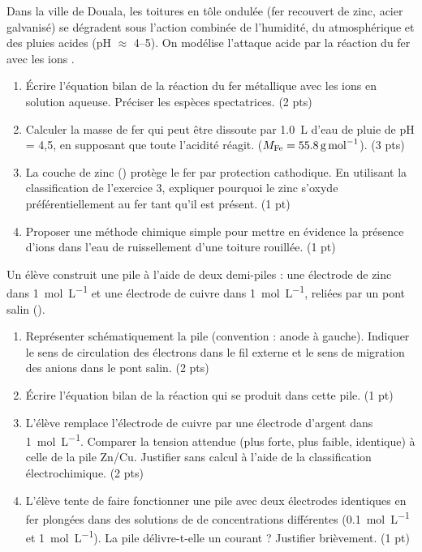 \documentclass[11pt]{article}
\begin{document}
\begin{exercice}
Dans la ville de Douala, les toitures en tôle ondulée (fer recouvert de zinc, acier galvanisé) se dégradent sous l'action combinée de l'humidité, du  atmosphérique et des pluies acides (pH $\approx$ 4--5). On modélise l'attaque acide par la réaction du fer avec les ions .
\begin{enumerate}
    \item Écrire l'équation bilan de la réaction du fer métallique avec les ions  en solution aqueuse. Préciser les espèces spectatrices. (2 pts)
    \item Calculer la masse de fer qui peut être dissoute par \SI{1,0}{L} d'eau de pluie de pH = 4,5, en supposant que toute l'acidité réagit. ($M_{\ce{Fe}} = \SI{55,8}{g.mol^{-1}}$). (3 pts)
    \item La couche de zinc () protège le fer par protection cathodique. En utilisant la classification de l'exercice 3, expliquer pourquoi le zinc s'oxyde préférentiellement au fer tant qu'il est présent. (1 pt)
    \item Proposer une méthode chimique simple pour mettre en évidence la présence d'ions  dans l'eau de ruissellement d'une toiture rouillée. (1 pt)
\end{enumerate}
\end{exercice}

\begin{exercice}
Un élève construit une pile à l'aide de deux demi-piles : une électrode de zinc dans  \SI{1}{mol.L^{-1}} et une électrode de cuivre dans  \SI{1}{mol.L^{-1}}, reliées par un pont salin ().
\begin{enumerate}
    \item Représenter schématiquement la pile (convention : anode à gauche). Indiquer le sens de circulation des électrons dans le fil externe et le sens de migration des anions dans le pont salin. (2 pts)
    \item Écrire l'équation bilan de la réaction qui se produit dans cette pile. (1 pt)
    \item L'élève remplace l'électrode de cuivre par une électrode d'argent dans  \SI{1}{mol.L^{-1}}. Comparer la tension attendue (plus forte, plus faible, identique) à celle de la pile Zn/Cu. Justifier sans calcul à l'aide de la classification électrochimique. (2 pts)
    \item L'élève tente de faire fonctionner une pile avec deux électrodes identiques en fer plongées dans des solutions de  de concentrations différentes (\SI{0,1}{mol.L^{-1}} et \SI{1}{mol.L^{-1}}). La pile délivre-t-elle un courant ? Justifier brièvement. (1 pt)
\end{enumerate}
\end{exercice}
\end{document}
